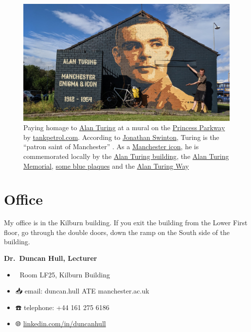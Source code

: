 \documentclass[
  12pt,
]{book}
\providecommand{\tightlist}{%
  \setlength{\itemsep}{0pt}\setlength{\parskip}{0pt}}
\begin{document}
\begin{figure}

{\centering \includegraphics[width=1\linewidth]{images/turingicon} 

}

\caption{Paying homage to \href{https://en.wikipedia.org/wiki/Alan_Turing}{Alan Turing} at a mural on the \href{https://en.wikipedia.org/wiki/A5103_road}{Princess Parkway} by \href{http://tankpetrol.com/}{tankpetrol.com}. According to \href{https://www.manturing.net/jonathan}{Jonathan Swinton}, Turing is the ``patron saint of Manchester'' \citep{manturing}. As a \href{https://en.wikipedia.org/wiki/Symbols_of_Manchester}{Manchester icon}, he is commemorated locally by the \href{https://en.wikipedia.org/wiki/Alan_Turing_Building}{Alan Turing building}, the \href{https://en.wikipedia.org/wiki/Alan_Turing_Memorial}{Alan Turing Memorial}, \href{https://duncan.hull.name/2021/07/07/turings-house/}{some blue plaques} and the \href{https://www.google.com/maps/place/Alan+Turing+Way,+Manchester/}{Alan Turing Way} \citep{turingway}}\label{fig:unnamed-chunk-9}
\end{figure}

\hypertarget{office}{%
\section{Office}\label{office}}

My office is in the Kilburn building. If you exit the building from the Lower First floor, go through the double doors, down the ramp on the South side of the building.

\textbf{Dr.~Duncan Hull, Lecturer} 👨‍💻

\begin{itemize}
\tightlist
\item
  🏢 Room LF25, Kilburn Building
\item
  📥 email: duncan.hull ATE manchester.ac.uk
\item
  ☎️ telephone: +44 161 275 6186
\item
  🌐 \href{https://uk.linkedin.com/in/duncanhull}{linkedin.com/in/duncanhull}
\end{itemize}
\end{document}

